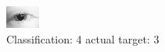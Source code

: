 \begin{figure}[h!]
\begin{center}
\includegraphics[width=0.60\columnwidth]{figures/ID10_class_4_target_3.png}
\end{center}
\caption{ Classification: 4 actual target: 3}
\label{fig:ID10_class_4_target_3}
\end{figure}
